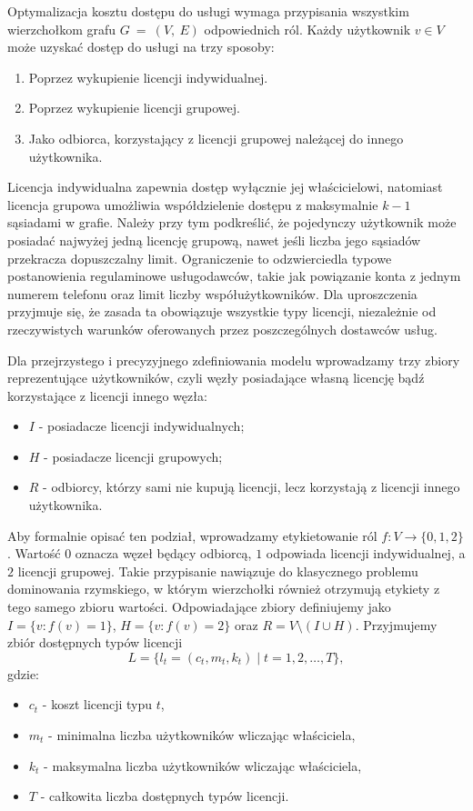 Optymalizacja kosztu dostępu do usługi wymaga przypisania wszystkim wierzchołkom grafu $G ~=~ (V,~E)$ odpowiednich ról. Każdy użytkownik $v \in V$ może uzyskać dostęp do usługi na trzy sposoby:
\begin{enumerate}
  \item Poprzez wykupienie licencji indywidualnej.
  \item Poprzez wykupienie licencji grupowej.
  \item Jako odbiorca, korzystający z licencji grupowej należącej do innego użytkownika.
\end{enumerate}
Licencja indywidualna zapewnia dostęp wyłącznie jej właścicielowi, natomiast licencja grupowa umożliwia współdzielenie dostępu z maksymalnie $k-1$ sąsiadami w grafie. Należy przy tym podkreślić, że pojedynczy użytkownik może posiadać najwyżej jedną licencję grupową, nawet jeśli liczba jego sąsiadów przekracza dopuszczalny limit.
Ograniczenie to odzwierciedla typowe postanowienia regulaminowe usługodawców, takie jak powiązanie konta z jednym numerem telefonu oraz limit liczby współużytkowników.
Dla uproszczenia przyjmuje się, że zasada ta obowiązuje wszystkie typy licencji, niezależnie od rzeczywistych warunków oferowanych przez poszczególnych dostawców usług.

Dla przejrzystego i precyzyjnego zdefiniowania modelu wprowadzamy trzy zbiory reprezentujące użytkowników, czyli węzły posiadające własną licencję bądź korzystające z licencji innego węzła:
\begin{itemize}
  \item $I$ - posiadacze licencji indywidualnych;
  \item $H$ - posiadacze licencji grupowych;
  \item $R$ - odbiorcy, którzy sami nie kupują licencji, lecz korzystają z licencji innego użytkownika.
\end{itemize}

Aby formalnie opisać ten podział, wprowadzamy etykietowanie ról $f:V\to\{0,1,2\}$.
Wartość $0$ oznacza węzeł będący odbiorcą, $1$ odpowiada licencji indywidualnej, a $2$ licencji grupowej.
Takie przypisanie nawiązuje do klasycznego problemu dominowania rzymskiego, w którym wierzchołki również otrzymują etykiety z tego samego zbioru wartości.
Odpowiadające zbiory definiujemy jako $I=\{v:f(v)=1\}$, $H=\{v:f(v)=2\}$ oraz $R=V\setminus(I\cup H)$.
Przyjmujemy zbiór dostępnych typów licencji
\begin{equation}
  L = \{ l_t = (c_t, m_t, k_t) \mid t = 1,2,\dots,T \},
  \label{eq:license_family}
\end{equation}
gdzie:
\begin{itemize}
  \item $c_t$ - koszt licencji typu $t$,
  \item $m_t$ - minimalna liczba użytkowników wliczając właściciela,
  \item $k_t$ - maksymalna liczba użytkowników wliczając właściciela,
  \item $T$ - całkowita liczba dostępnych typów licencji.
\end{itemize}


